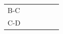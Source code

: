 {\begin{tabular}[t]{|l|l|l|l|l|l|}
     \tabularnewline\cline{1-1}\cline{2-2}\cline{3-3}\cline{4-4}\cline{5-5}\cline{6-6}
        B-C &
         &
         &
         &
         &
     \tabularnewline\cline{1-1}\cline{2-2}\cline{3-3}\cline{4-4}\cline{5-5}\cline{6-6}
        C-D &
         &
         &
         &
         &

\end{tabular}}
